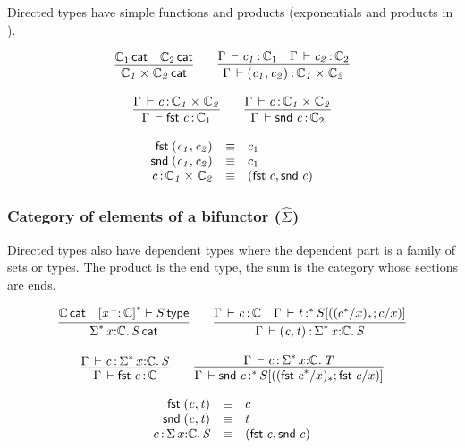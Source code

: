 \documentclass[11pt]{article}
\theoremstyle{plain}
\begin{document}
Directed types have simple functions and products (exponentials and
products in \Cat).


\[
\begin{array}{c}
\infer{\wfdtp{\prd{\C_1}{\C_2}}}
      {\wfdtp{\C_1} &
        \wfdtp{\C_2}}
\qquad
\infer{\ofdtp{\Gamma}{\pair{c_1}{c_2}}{\prd {\C_1} {\C_2}}}
      {\ofdtp{\Gamma}{c_1}{\C_1} &
       \ofdtp{\Gamma}{c_2}{\C_2}}
\\ \\
\infer{\ofdtp{\Gamma}{\fst c}{\C_1}}
      {\ofdtp{\Gamma}{c}{\prd{\C_1}{\C_2}}}
\qquad
\infer{\ofdtp{\Gamma}{\snd c}{\C_2}}
      {\ofdtp{\Gamma}{c}{\prd{\C_1}{\C_2}}}
\end{array}
\]

\[
\begin{array}{rcll}
\mathit{\mathsf{fst}_{} \: \mathit{(c_1,c_2)_{}}} & \equiv & c_1 \\
\mathit{\mathsf{snd}_{} \: \mathit{(c_1,c_2)_{}}} & \equiv & c_1 \\
c \, \mathit{:} \, \mathit{\mathbb{C}_1} \times_{\mathit{}} \mathit{\mathbb{C}_2} & \equiv & \mathit{(\mathit{\mathsf{fst}_{} \: c},\mathit{\mathsf{snd}_{} \: c})_{}}
\end{array}
\]

\subsubsection{Category of elements of a bifunctor ($\hat{\Sigma}$)}

Directed types also have dependent types where the dependent part is a
family of sets or types. The product is the end type, the sum is the
category whose sections are ends.

\[
\begin{array}{c}
\infer{\wfdtp{\sigmacat{\vcond}{x}{\C}{S}}}
      {\wfdtp{\C} &
        \wftp{\dupctx{\catvar{x}{\co}{\C}}{\vcond}}{S}}
\qquad
\infer{\ofdtp{\Gamma}{\pair{c}{t}}{\sigmacat{\vcond} x \C S}}
      {\ofdtp{\Gamma}{c}{\C} &
       \oftpe{\Gamma}{t}{\vcond}{\tsubst{S}{\substdup{(c^\vcond/x)}{\vcond}{c/x}}}}
\\ \\
\infer{\ofdtp{\Gamma}{\fst c}{\C}}
      {\ofdtp{\Gamma}{c}{\sigmacat{\vcond}{x}{\C}{S}}}
\qquad
\infer{\oftpe{\Gamma}{\snd c}{\vcond}{\tsubst{S}{\substdup{(\fst c^\vcond / x)}{\vcond}{\fst c/x}}}}
      {\ofdtp{\Gamma}{c}{\sigmacat{\vcond}{x}{\C}{T}}}
\end{array}
\]

\[
\begin{array}{rcll}
\mathit{\mathsf{fst}_{} \: \mathit{(c,t)_{}}} & \equiv & c \\
\mathit{\mathsf{snd}_{} \: \mathit{(c,t)_{}}} & \equiv & t \\
c \, \mathit{:} \, \textnormal{$\Sigma$}\,x \mathit{:} \mathbb{C}.\,\mathit{S} & \equiv & \mathit{(\mathit{\mathsf{fst}_{} \: c},\mathit{\mathsf{snd}_{} \: c})_{}}
\end{array}
\]
\end{document}
